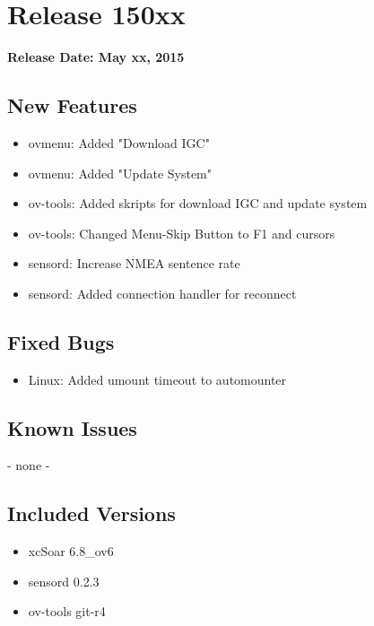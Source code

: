\chapter*{Release 150xx}

\begin{flushleft}
	\textbf{Release Date: May xx, 2015}
\end{flushleft}

\section*{New Features}

\begin{itemize}
	\item ovmenu: Added "Download IGC"
	\item ovmenu: Added "Update System"
	\item ov-tools: Added skripts for download IGC and update system
	\item ov-tools: Changed Menu-Skip Button to F1 and cursors
	\item sensord: Increase NMEA sentence rate
	\item sensord: Added connection handler for reconnect
\end{itemize}

\section*{Fixed Bugs}
\begin{itemize}
	\item Linux: Added umount timeout to automounter
\end{itemize}

\section*{Known Issues}
	- none -

\section*{Included Versions}

\begin{itemize}
	\item xcSoar 6.8\_ov6
	\item sensord 0.2.3
	\item ov-tools git-r4
\end{itemize}